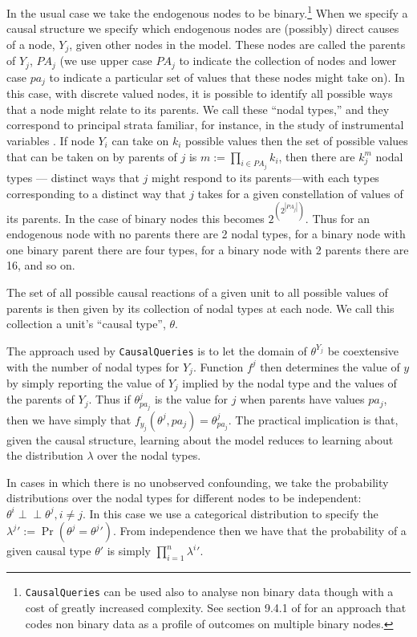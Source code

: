 \documentclass[
  11pt,
  article]{jss}
\begin{document}
In the usual case we take the endogenous nodes to be binary.\footnote{\texttt{CausalQueries}
  can be used also to analyse non binary data though with a cost of
  greatly increased complexity. See section 9.4.1 of \citet{ii2023} for
  an approach that codes non binary data as a profile of outcomes on
  multiple binary nodes.} When we specify a causal structure we specify
which endogenous nodes are (possibly) direct causes of a node, \(Y_j\),
given other nodes in the model. These nodes are called the parents of
\(Y_j\), \(PA_j\) (we use upper case \(PA_j\) to indicate the collection
of nodes and lower case \(pa_j\) to indicate a particular set of values
that these nodes might take on). In this case, with discrete valued
nodes, it is possible to identify all possible ways that a node might
relate to its parents. We call these ``nodal types,'' and they
correspond to principal strata familiar, for instance, in the study of
instrumental variables \citep{frangakis2002principal}. If node \(Y_i\)
can take on \(k_i\) possible values then the set of possible values that
can be taken on by parents of \(j\) is \(m :=\prod_{i\in PA_j}k_i\),
then there are \(k_j^{m}\) nodal types --- distinct ways that \(j\)
might respond to its parents---with each types corresponding to a
distinct way that \(j\) takes for a given constellation of values of its
parents. In the case of binary nodes this becomes
\(2^{\left(2^{|PA_j|}\right)}\). Thus for an endogenous node with no
parents there are 2 nodal types, for a binary node with one binary
parent there are four types, for a binary node with 2 parents there are
16, and so on.

The set of all possible causal reactions of a given unit to all possible
values of parents is then given by its collection of nodal types at each
node. We call this collection a unit's ``causal type'', \(\theta\).

The approach used by \texttt{CausalQueries} is to let the domain of
\(\theta^{Y_j}\) be coextensive with the number of nodal types for
\(Y_j\). Function \(f^j\) then determines the value of \(y\) by simply
reporting the value of \(Y_j\) implied by the nodal type and the values
of the parents of \(Y_j\). Thus if \(\theta^j_{pa_j}\) is the value for
\(j\) when parents have values \(pa_j\), then we have simply that
\(f_{y_j}(\theta^{j}, pa_j) = \theta^j_{pa_j}\). The practical
implication is that, given the causal structure, learning about the
model reduces to learning about the distribution \(\lambda\) over the
nodal types.

In cases in which there is no unobserved confounding, we take the
probability distributions over the nodal types for different nodes to be
independent: \(\theta^i \perp\!\!\! \perp \theta^j, i\neq j\). In this
case we use a categorical distribution to specify the
\({\lambda^j}' := \Pr(\theta^j = {\theta^j}')\). From independence then
we have that the probability of a given causal type \(\theta'\) is
simply \(\prod_{i=1}^n {\lambda^i}'\).
\end{document}

